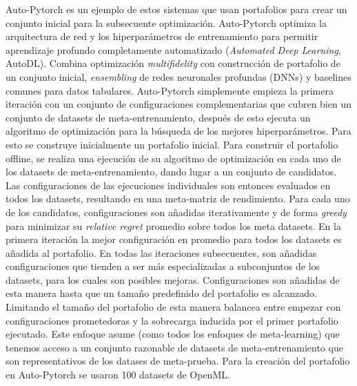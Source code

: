 Auto-Pytorch \cite{zimmer2021auto} es un ejemplo de estos sistemas que usan portafolios para crear un conjunto inicial para la subsecuente optimización. Auto-Pytorch optimiza la arquitectura de red y los hiperparámetros de entrenamiento para permitir aprendizaje profundo completamente automatizado (\textit{Automated Deep Learning}, AutoDL). Combina optimización \textit{multifidelity} con construcción de portafolio de un conjunto inicial, \textit{ensembling} de redes neuronales profundas (DNNs) y baselines comunes para datos tabulares. Auto-Pytorch simplemente empieza la primera iteración con un conjunto de configuraciones complementarias que cubren bien un conjunto de datasets de meta-entrenamiento, después de esto ejecuta un algoritmo de optimización para la búsqueda de los mejores hiperparámetros. Para esto se construye inicialmente un portafolio inicial. Para construir el portafolio offline, se realiza una ejecución de su algoritmo de optimización en cada uno de los datasets de meta-entrenamiento, dando lugar a un conjunto de candidatos. Las configuraciones de las ejecuciones individuales son entonces evaluados en todos los datasets, resultando en una meta-matriz de rendimiento. Para cada uno de los candidatos, configuraciones son añadidas iterativamente y de forma \textit{greedy} para minimizar su \textit{relative regret} promedio sobre todos los meta datasets. En la primera iteración la mejor configuración en promedio para todos los datasets es añadida al portafolio. En todas las iteraciones subsecuentes, son añadidas configuraciones que tienden a ser más especializadas a subconjuntos de los datasets, para los cuales son posibles mejoras. Configuraciones son añadidas de esta manera hasta que un tamaño predefinido del portafolio es alcanzado. Limitando el tamaño del portafolio de esta manera balancea entre empezar con configuraciones prometedoras y la sobrecarga inducida por el primer portafolio ejecutado. Este enfoque asume (como todos los enfoques de meta-learning) que tenemos acceso a un conjunto razonable de datasets de meta-entrenamiento que son representativos de los datases de meta-prueba. Para la creación del portafolio en Auto-Pytorch se usaron 100 datasets de OpenML.

